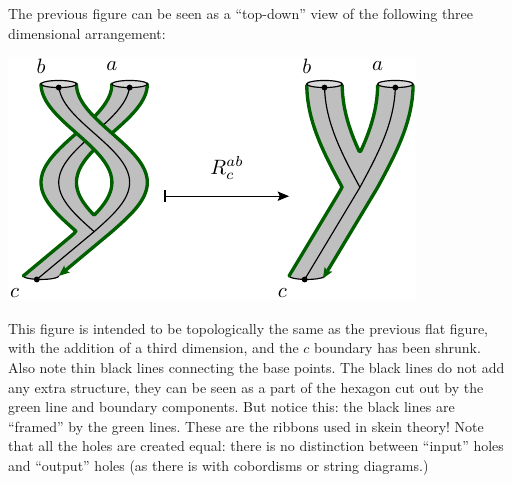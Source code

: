 \documentclass[aps, tightenlines, letterpaper, onecolumn, superscriptaddress, notitlepage, 11pt, groupedaddress]{revtex4-1}
\begin{document}
The previous figure can be seen as a ``top-down'' view of the
following three dimensional arrangement:
\begin{center}
\includegraphics[]{pic-rmove-skein.pdf}
\end{center}
This figure is intended to be topologically
the same as the previous flat figure,
with the addition of a third dimension,
and the $c$ boundary has been shrunk.
Also note thin black lines
connecting the base points.
The black lines do not add any extra structure, they can
be seen as a part of the hexagon cut out by
the green line and boundary components.
But notice this: the black lines are ``framed'' by the green lines. 
These are the ribbons used in skein theory!
Note that all the holes are created equal: there is
no distinction between ``input'' holes and ``output'' holes
(as there is with cobordisms or string diagrams.)

\end{document}
